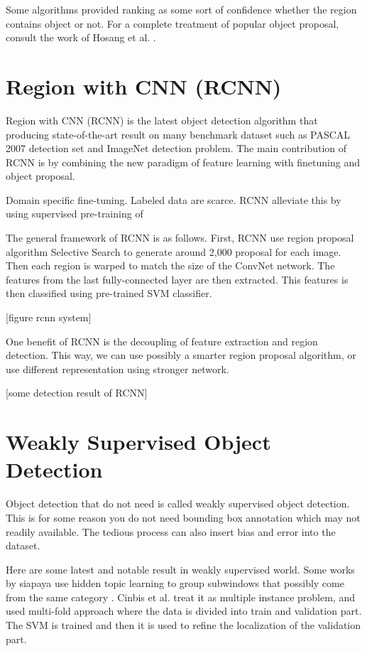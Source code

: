 \documentclass[a4paper,11pt]{kth-mag}
\begin{document}
Some algorithms provided ranking as some sort of confidence whether the region contains object or not. For a complete treatment of popular object proposal, consult the work of Hosang et al. \cite{hosang}.

\section{Region with CNN (RCNN)}
Region with CNN (RCNN) is the latest object detection algorithm that producing state-of-the-art result on many benchmark dataset such as PASCAL 2007 detection set and ImageNet detection problem. The main contribution of RCNN is by combining the new paradigm of feature learning with finetuning and object proposal.

Domain specific fine-tuning.
Labeled data are scarce. RCNN alleviate this by using supervised pre-training of

The general framework of RCNN is as follows. First, RCNN use region proposal algorithm Selective Search to generate around 2,000 proposal for each image. Then each region is warped to match the size of the ConvNet network. The features from the last fully-connected layer are then extracted. This features is then classified using pre-trained SVM classifier.

[figure rcnn system]

One benefit of RCNN is the decoupling of feature extraction and region detection. This way, we can use possibly a smarter region proposal algorithm, or use different representation using stronger network.

[some detection result of RCNN]

\section{Weakly Supervised Object Detection}
Object detection that do not need is called weakly supervised object detection. This is for some reason you do not need bounding box annotation which may not readily available. The tedious process can also insert bias and error into the dataset. 

Here are some latest and notable result in weakly supervised world.
Some works by siapaya use hidden topic learning to group subwindows that possibly come from the same category \cite{siapaya}.
Cinbis et al. treat it as multiple instance problem, and used multi-fold approach where the data is divided into train and validation part. The SVM is trained and then it is used to refine the localization of the validation part.
\end{document}
